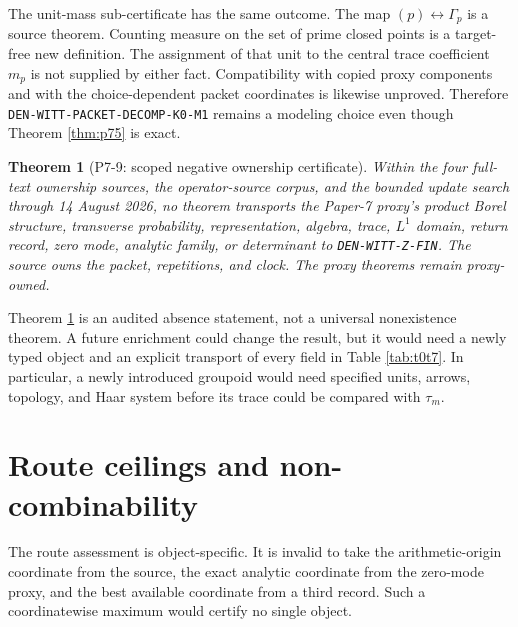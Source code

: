 \documentclass[11pt,a4paper]{article}
\newtheorem{theorem}{Theorem}[section]
\theoremstyle{definition}
\begin{document}
The unit-mass sub-certificate has the same outcome.  The map
$(p)\leftrightarrow\Gamma_p$ is a source theorem.  Counting measure on the
set of prime closed points is a target-free new definition.  The assignment
of that unit to the central trace coefficient $m_p$ is not supplied by either
fact.  Compatibility with copied proxy components and with the
choice-dependent packet coordinates is likewise unproved.  Therefore
\texttt{DEN-WITT-PACKET-DECOMP-K0-M1} remains a modeling choice even though
Theorem \ref{thm:p75} is exact.

\begin{theorem}[P7-9: scoped negative ownership certificate]
\label{thm:p79}
Within the four full-text ownership sources, the operator-source corpus, and
the bounded update search through 14 August 2026, no theorem transports the
Paper-7 proxy's product Borel structure, transverse probability,
representation, algebra, trace, $L^1$ domain, return record, zero mode,
analytic family, or determinant to
\textnormal{\texttt{DEN-WITT-Z-FIN}}.  The source owns
the packet, repetitions, and clock.  The proxy theorems remain proxy-owned.
\end{theorem}

Theorem \ref{thm:p79} is an audited absence statement, not a universal
nonexistence theorem.  A future enrichment could change the result, but it
would need a newly typed object and an explicit transport of every field in
Table \ref{tab:t0t7}.  In particular, a newly introduced groupoid would need
specified units, arrows, topology, and Haar system before its trace could be
compared with $\tau_m$.

\section{Route ceilings and non-combinability}
\label{sec:routes}

The route assessment is object-specific.  It is invalid to take the
arithmetic-origin coordinate from the source, the exact analytic coordinate
from the zero-mode proxy, and the best available coordinate from a third
record.  Such a coordinatewise maximum would certify no single object.
\end{document}
